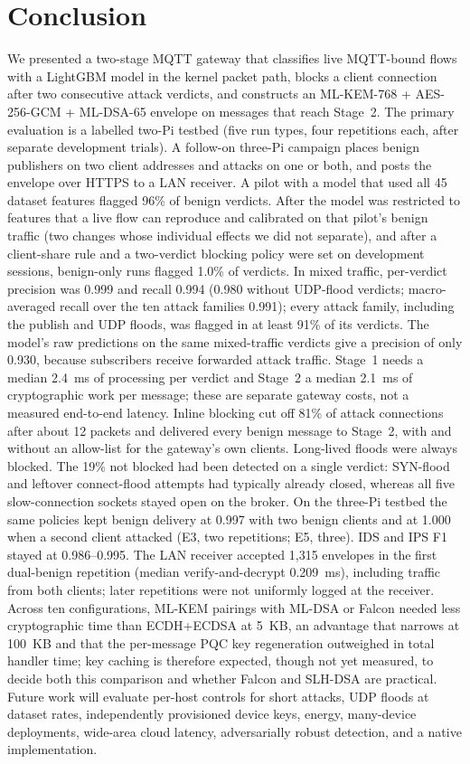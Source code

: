 \documentclass[journal]{IEEEtran}
\begin{document}
\section{Conclusion}
\label{sec:conclusion}

We presented a two-stage MQTT gateway that classifies live MQTT-bound flows with a LightGBM model in the kernel packet path, blocks a client connection after two consecutive attack verdicts, and constructs an ML-KEM-768 + AES-256-GCM + ML-DSA-65 envelope on messages that reach Stage~2. The primary evaluation is a labelled two-Pi testbed (five run types, four repetitions each, after separate development trials). A follow-on three-Pi campaign places benign publishers on two client addresses and attacks on one or both, and posts the envelope over HTTPS to a LAN receiver. A pilot with a model that used all 45 dataset features flagged 96\% of benign verdicts. After the model was restricted to features that a live flow can reproduce and calibrated on that pilot's benign traffic (two changes whose individual effects we did not separate), and after a client-share rule and a two-verdict blocking policy were set on development sessions, benign-only runs flagged 1.0\% of verdicts. In mixed traffic, per-verdict precision was 0.999 and recall 0.994 (0.980 without UDP-flood verdicts; macro-averaged recall over the ten attack families 0.991); every attack family, including the publish and UDP floods, was flagged in at least 91\% of its verdicts. The model's raw predictions on the same mixed-traffic verdicts give a precision of only 0.930, because subscribers receive forwarded attack traffic. Stage~1 needs a median 2.4~ms of processing per verdict and Stage~2 a median 2.1~ms of cryptographic work per message; these are separate gateway costs, not a measured end-to-end latency. Inline blocking cut off 81\% of attack connections after about 12 packets and delivered every benign message to Stage~2, with and without an allow-list for the gateway's own clients. Long-lived floods were always blocked. The 19\% not blocked had been detected on a single verdict: SYN-flood and leftover connect-flood attempts had typically already closed, whereas all five slow-connection sockets stayed open on the broker. On the three-Pi testbed the same policies kept benign delivery at 0.997 with two benign clients and at 1.000 when a second client attacked (E3, two repetitions; E5, three). IDS and IPS F1 stayed at 0.986--0.995. The LAN receiver accepted 1,315 envelopes in the first dual-benign repetition (median verify-and-decrypt 0.209~ms), including traffic from both clients; later repetitions were not uniformly logged at the receiver. Across ten configurations, ML-KEM pairings with ML-DSA or Falcon needed less cryptographic time than ECDH+ECDSA at 5~KB, an advantage that narrows at 100~KB and that the per-message PQC key regeneration outweighed in total handler time; key caching is therefore expected, though not yet measured, to decide both this comparison and whether Falcon and SLH-DSA are practical. Future work will evaluate per-host controls for short attacks, UDP floods at dataset rates, independently provisioned device keys, energy, many-device deployments, wide-area cloud latency, adversarially robust detection, and a native implementation.



\end{document}
